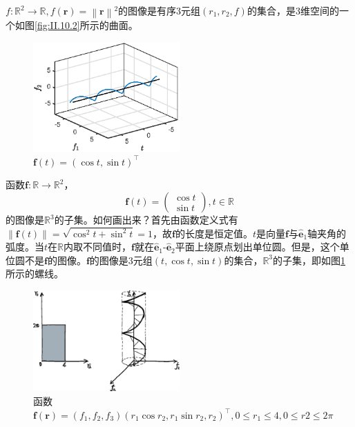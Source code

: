 \documentclass[main.tex]{subfiles}
\begin{document}
\begin{example}\label{exp:II.12.5}
$f:\mathbb{R}^2\rightarrow\mathbb{R},f\left(\mathbf{r}\right)=\left\|\mathbf{r}\right\|^2$的图像是有序3元组$\left(r_1,r_2,f\right)$的集合，是3维空间的一个如图\ref{fig:II.10.2}所示的曲面。
\end{example}

\begin{figure}[h]
    \centering
    \includegraphics[width=0.5\textwidth]{images/II.10.3.eps}
    \caption{$\mathbf{f}\left(t\right)=\left(\cos t,\sin t\right)^\intercal$}
    \label{fig:II.10.3}
\end{figure}

\begin{example}\label{exp:II.12.6}
    函数$\mathbf{f}:\mathbb{R}\rightarrow\mathbb{R}^2$，
\[
\mathbf{f}\left(t\right)=\left(\begin{array}{c}\cos t\\\sin t\end{array}\right),t\in\mathbb{R}
\]
的图像是$\mathbb{R}^3$的子集。如何画出来？首先由函数定义式有$\left\|\mathbf{f}\left(t\right)\right\|=\sqrt{\cos^2t+\sin^2t}=1$，故$\mathbf{f}$的长度是恒定值。$t$是向量$\mathbf{f}$与$\mathbf{\hat{e}}_1$轴夹角的弧度。当$t$在$\mathbb{R}$内取不同值时，$\mathbf{f}$就在$\mathbf{\hat{e}}_1$-$\mathbf{\hat{e}}_2$平面上绕原点划出单位圆。但是，这个单位圆不是$\mathbf{f}$的图像。$\mathbf{f}$的图像是3元组$\left(t,\cos t,\sin t\right)$的集合，$\mathbb{R}^3$的子集，即如图\ref{fig:II.10.3}所示的螺线。
\end{example}

\begin{figure}[h]
    \centering
    \includegraphics[width=0.5\textwidth]{images/II.10.4.eps}
    \caption{函数$\mathbf{f}\left(\mathbf{r}\right)=\left(f_1,f_2,f_3\right)\left(r_1\cos r_2, r_1\sin r_2,r_2\right)^\intercal,0\leq r_1\leq 4,0\leq r2\leq 2\pi$}
    \label{fig:II.10.4}
\end{figure}
\end{document}
